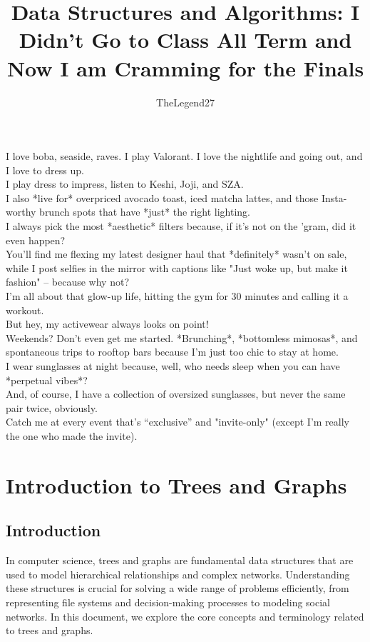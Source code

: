 \documentclass{book}
\title{Data Structures and Algorithms: I Didn't Go to Class All Term and Now I am Cramming for the Finals}
\author{TheLegend27}
\begin{document}
\maketitle

\begin{center}
I love boba, seaside, raves. I play Valorant. I love the nightlife and going out, and I love to dress up.\\
I play dress to impress, listen to Keshi, Joji, and SZA.\\
I also *live for* overpriced avocado toast, iced matcha lattes, and those Insta-worthy brunch spots that have *just* the right lighting.\\
I always pick the most *aesthetic* filters because, if it’s not on the 'gram, did it even happen?\\
You’ll find me flexing my latest designer haul that *definitely* wasn’t on sale, while I post selfies in the mirror with captions like "Just woke up, but make it fashion" – because why not?\\
I’m all about that glow-up life, hitting the gym for 30 minutes and calling it a workout.\\
But hey, my activewear always looks on point!\\
Weekends? Don't even get me started. *Brunching*, *bottomless mimosas*, and spontaneous trips to rooftop bars because I’m just too chic to stay at home.\\
I wear sunglasses at night because, well, who needs sleep when you can have *perpetual vibes*?\\
And, of course, I have a collection of oversized sunglasses, but never the same pair twice, obviously.\\
Catch me at every event that's “exclusive” and "invite-only" (except I’m really the one who made the invite).\\
\end{center}

\thispagestyle{empty}  %

\linespread{1.2}
\thispagestyle{empty}
\tableofcontents
\thispagestyle{empty}


\twocolumn
\chapter{Introduction to Trees and Graphs}
\section{Introduction}
In computer science, trees and graphs are fundamental data structures that are used to model hierarchical relationships and complex networks. Understanding these structures is crucial for solving a wide range of problems efficiently, from representing file systems and decision-making processes to modeling social networks. In this document, we explore the core concepts and terminology related to trees and graphs.
\end{document}
